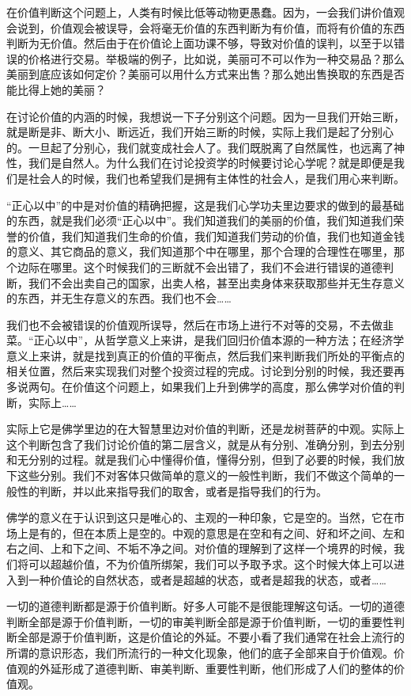 \documentclass[UTF8, 12pt, a4paper]{ctexrep}
\begin{document}
在价值判断这个问题上，人类有时候比低等动物更愚蠢。因为，一会我们讲价值观会说到，价值观会被误导，会将毫无价值的东西判断为有价值，而将有价值的东西判断为无价值。然后由于在价值论上面功课不够，导致对价值的误判，以至于以错误的价格进行交易。举极端的例子，比如说，美丽可不可以作为一种交易品？那么美丽到底应该如何定价？美丽可以用什么方式来出售？那么她出售换取的东西是否能比得上她的美丽？

在讨论价值的内涵的时候，我想说一下子分别这个问题。因为一旦我们开始三断，就是断是非、断大小、断远近，我们开始三断的时候，实际上我们是起了分别心的。一旦起了分别心，我们就变成社会人了。我们既脱离了自然属性，也远离了神性，我们是自然人。为什么我们在讨论投资学的时候要讨论心学呢？就是即便是我们是社会人的时候，我们也希望我们是拥有主体性的社会人，是我们用心来判断。

“正心以中”的中是对价值的精确把握，这是我们心学功夫里边要求的做到的最基础的东西，就是我们必须“正心以中”。我们知道我们的美丽的价值，我们知道我们荣誉的价值，我们知道我们生命的价值，我们知道我们劳动的价值，我们也知道金钱的意义、其它商品的意义，我们知道那个中在哪里，那个合理的合理性在哪里，那个边际在哪里。这个时候我们的三断就不会出错了，我们不会进行错误的道德判断，我们不会出卖自己的国家，出卖人格，甚至出卖身体来获取那些并无生存意义的东西，并无生存意义的东西。我们也不会……

我们也不会被错误的价值观所误导，然后在市场上进行不对等的交易，不去做韭菜。“正心以中”，从哲学意义上来讲，是我们回归价值本源的一种方法；在经济学意义上来讲，就是找到真正的价值的平衡点，然后我们来判断我们所处的平衡点的相关位置，然后来实现我们对整个投资过程的完成。讨论到分别的时候，我还要再多说两句。在价值这个问题上，如果我们上升到佛学的高度，那么佛学对价值的判断，实际上……

实际上它是佛学里边的在大智慧里边对价值的判断，还是龙树菩萨的中观。实际上这个判断包含了我们讨论价值的第二层含义，就是从有分别、准确分别，到去分别和无分别的过程。就是我们心中懂得价值，懂得分别，但到了必要的时候，我们放下这些分别。我们不对客体只做简单的意义的一般性判断，我们不做这个简单的一般性的判断，并以此来指导我们的取舍，或者是指导我们的行为。

佛学的意义在于认识到这只是唯心的、主观的一种印象，它是空的。当然，它在市场上是有的，但在本质上是空的。中观的意思是在空和有之间、好和坏之间、左和右之间、上和下之间、不垢不净之间。对价值的理解到了这样一个境界的时候，我们将可以超越价值，不为价值所绑架，我们可以予取予求。这个时候大体上可以进入到一种价值论的自然状态，或者是超越的状态，或者是超我的状态，或者……

一切的道德判断都是源于价值判断。好多人可能不是很能理解这句话。一切的道德判断全部是源于价值判断，一切的审美判断全部是源于价值判断，一切的重要性判断全部是源于价值判断，这是价值论的外延。不要小看了我们通常在社会上流行的所谓的意识形态，我们所流行的一种文化现象，他们的底子全部来自于价值观。价值观的外延形成了道德判断、审美判断、重要性判断，他们形成了人们的整体的价值观。
\end{document}
